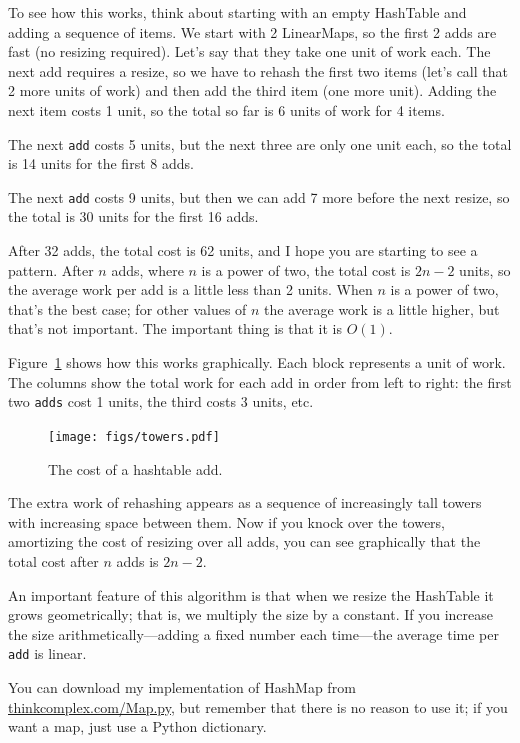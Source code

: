 \documentclass[10pt]{book}
\begin{document}
To see how this works, think about starting with an empty
HashTable and adding a sequence of items.  We start with 2 LinearMaps,
so the first 2 adds are fast (no resizing required).  Let's
say that they take one unit of work each.  The next add
requires a resize, so we have to rehash the first two
items (let's call that 2 more units of work) and then
add the third item (one more unit).  Adding the next item
costs 1 unit, so the total so far is
6 units of work for 4 items.

The next {\tt add} costs 5 units, but the next three
are only one unit each, so the total is 14 units for the
first 8 adds.

The next {\tt add} costs 9 units, but then we can add 7 more
before the next resize, so the total is 30 units for the
first 16 adds.

After 32 adds, the total cost is 62 units, and I hope you are starting
to see a pattern.  After $n$ adds, where $n$ is a power of two, the
total cost is $2n - 2$ units, so the average work per add is
a little less than 2 units.  When $n$ is a power of two, that's
the best case; for other values of $n$ the average work is a little
higher, but that's not important.  The important thing is that it
is $O(1)$.

Figure~\ref{fig.hash} shows how this works graphically.  Each
block represents a unit of work.  The columns show the total
work for each add in order from left to right: the first two
{\tt adds} cost 1 units, the third costs 3 units, etc.

\begin{figure}
\centerline{\texttt{[image: figs/towers.pdf]}}
\caption{The cost of a hashtable add.\label{fig.hash}}
\end{figure}

The extra work of rehashing appears as a sequence of increasingly
tall towers with increasing space between them.  Now if you knock
over the towers, amortizing the cost of resizing over all
adds, you can see graphically that the total cost after $n$
adds is $2n - 2$.

An important feature of this algorithm is that when we resize the
HashTable it grows geometrically; that is, we multiply the size by a
constant.  If you increase the size
arithmetically---adding a fixed number each time---the average time
per {\tt add} is linear.

You can download my implementation of HashMap from
\url{thinkcomplex.com/Map.py}, but remember that there
is no reason to use it; if you want a map, just use a Python dictionary.
\end{document}
